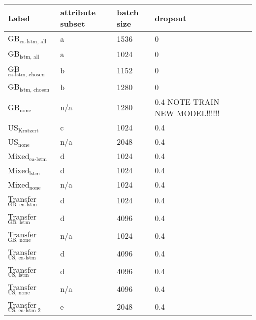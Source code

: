 \begin{tabular}{lllll}
    \toprule
    Label & attribute subset & batch size & dropout \\
    \midrule
    GB$_\text{ea-lstm, all}$ & a &  1536  & 0\\
    GB$_\text{lstm, all}$ & a & 1024 & 0  \\
    GB$_\text{ea-lstm, chosen}$ & b & 1152 & 0 \\
    GB$_\text{lstm, chosen}$ & b & 1280 & 0\\
    GB$_\text{none}$ & n/a & 1280 & 0.4 NOTE TRAIN NEW MODEL!!!!!!\\
    US$_\text{Kratzert}$  & c & 1024 & 0.4 \\
    US$_\text{none}$  & n/a & 2048 & 0.4\\
    Mixed$_\text{ea-lstm}$ & d & 1024 & 0.4\\
    Mixed$_\text{lstm}$ & d & 1024 & 0.4\\
    Mixed$_\text{none}$ & n/a & 1024 & 0.4\\
    Transfer$_\text{GB, ea-lstm}$ & d  & 1024 & 0.4 \\
    Transfer$_\text{GB, lstm}$ & d  & 4096 & 0.4\\
    Transfer$_\text{GB, none}$ & n/a & 1024 & 0.4 \\
    Transfer$_\text{US, ea-lstm}$ & d & 4096 & 0.4 \\
    Transfer$_\text{US, lstm}$  & d & 4096 & 0.4 \\ 
    Transfer$_\text{US, none}$  & n/a & 4096 & 0.4 \\
    Transfer$_\text{US, ea-lstm 2}$ & e & 2048 & 0.4 \\

\end{tabular}
